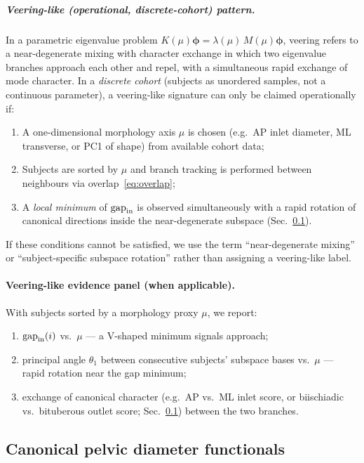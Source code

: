 \documentclass[11pt]{article}
\begin{document}
\subparagraph{Veering-like (operational, discrete-cohort) pattern.}
In a parametric eigenvalue problem $K(\mu)\boldsymbol\phi=\lambda(\mu)\,M(\mu)\boldsymbol\phi$, veering refers to a near-degenerate mixing with character exchange in which two eigenvalue branches approach each other and repel, with a simultaneous rapid exchange of mode character.
In a \emph{discrete cohort} (subjects as unordered samples, not a continuous parameter), a veering-like signature can only be claimed operationally if:
\begin{enumerate}[leftmargin=1.8em]
\item A one-dimensional morphology axis $\mu$ is chosen (e.g.\ AP inlet diameter, ML transverse, or PC1 of shape) from available cohort data;
\item Subjects are sorted by $\mu$ and branch tracking is performed between neighbours via overlap~\eqref{eq:overlap};
\item A \emph{local minimum} of $\mathrm{gap}_{\rm in}$ is observed simultaneously with a rapid rotation of canonical directions inside the near-degenerate subspace (Sec.~\ref{sec:canonical}).
\end{enumerate}
If these conditions cannot be satisfied, we use the term ``near-degenerate mixing'' or ``subject-specific subspace rotation'' rather than assigning a veering-like label.

\paragraph{Veering-like evidence panel (when applicable).}
With subjects sorted by a morphology proxy $\mu$, we report:
\begin{enumerate}[leftmargin=1.8em,label=(\roman*)]
\item $\mathrm{gap}_{\rm in}(i)$ vs.\ $\mu$ — a V-shaped minimum signals approach;
\item principal angle $\theta_1$ between consecutive subjects' subspace bases vs.\ $\mu$ — rapid rotation near the gap minimum;
\item exchange of canonical character (e.g.\ AP vs.\ ML inlet score, or biischiadic vs.\ bituberous outlet score; Sec.~\ref{sec:canonical}) between the two branches.
\end{enumerate}

\subsection{Canonical pelvic diameter functionals}
\label{sec:canonical}
\end{document}

